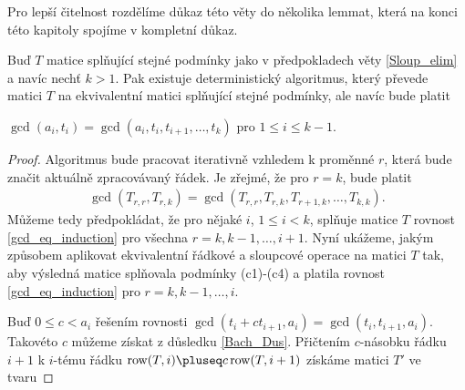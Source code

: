 Pro lepší čitelnost rozdělíme důkaz této věty do několika lemmat, která na konci
této kapitoly spojíme v kompletní důkaz.

\begin{lem} \label{Sloup_elim_GCD}
Buď $ T $ matice splňující stejné podmínky jako v předpokladech věty
\ref{Sloup_elim} a navíc nechť $ k > 1 $. Pak existuje deterministický
algoritmus, který převede matici $ T $ na ekvivalentní matici splňující stejné
podmínky, ale navíc bude platit
\begin{Cond}[resume=Sloup_elim_CONDS]
    \item $ \gcd(a_i, t_i) = \gcd(a_i, t_i, t_{i+1},\dots, t_k) $ pro
        $ 1 \leq i \leq k - 1 $.
\end{Cond}
\end{lem}
\begin{proof}
Algoritmus bude pracovat iterativně vzhledem k proměnné $ r $, která bude značit
aktuálně zpracovávaný řádek. Je zřejmé, že pro $ r = k $, bude platit
\begin{align} \label{gcd_eq_induction}
    \gcd(T_{r,r}, T_{r,k}) = \gcd(T_{r,r}, T_{r,k},T_{r+1,k},\dots, T_{k,k}).
\end{align}
Můžeme tedy předpokládat, že pro nějaké $ i $, $ 1 \leq i < k $, splňuje
matice $ T $ rovnost \ref{gcd_eq_induction} pro všechna $ r = k, k-1,\dots, i + 1 $.
Nyní ukážeme, jakým způsobem aplikovat ekvivalentní řádkové a sloupcové operace
na matici $ T $ tak, aby výsledná matice splňovala podmínky (c1)-(c4) a platila
rovnost \ref{gcd_eq_induction} pro $ r = k, k-1,\dots, i $.

Buď $ 0 \leq c < a_i $ řešením rovnosti
$ \gcd(t_i + ct_{i+1}, a_i) = \gcd(t_i, t_{i+1}, a_i) $.
Takovéto $ c $ můžeme získat z důsledku \ref{Bach_Dus}. Přičtením $ c $-násobku
řádku $ i + 1 $ k $ i $-tému řádku $ \operatorname{row}(T, i) \pluseq c \operatorname{row}(T, i + 1) $
získáme matici $ T' $ ve tvaru


\end{proof}
